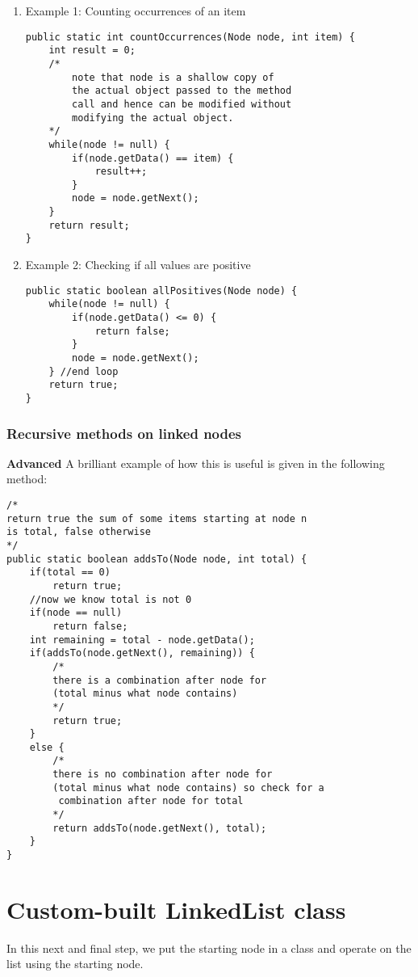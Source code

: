 \begin{enumerate}
\item Example 1: Counting occurrences of an item
\begin{lstlisting}
public static int countOccurrences(Node node, int item) {
	int result = 0;
	/*
		note that node is a shallow copy of 
		the actual object passed to the method 
		call and hence can be modified without
		modifying the actual object. 
	*/
	while(node != null) { 
		if(node.getData() == item) {
			result++;
		}
		node = node.getNext();
	}
	return result;
}	
\end{lstlisting}

\item Example 2: Checking if all values are positive
\begin{lstlisting}
public static boolean allPositives(Node node) {
	while(node != null) { 
		if(node.getData() <= 0) {
			return false;
		}
		node = node.getNext();
	} //end loop
	return true;
}	
\end{lstlisting}
\end{enumerate}

\newpage

\subsubsection{Recursive methods on linked nodes}

\textbf{Advanced} A brilliant example of how this is useful is given in the following method:

\begin{lstlisting}
/*
return true the sum of some items starting at node n
is total, false otherwise
*/
public static boolean addsTo(Node node, int total) {
	if(total == 0)
		return true;	
	//now we know total is not 0
	if(node == null) 
		return false;
	int remaining = total - node.getData();
	if(addsTo(node.getNext(), remaining)) {
		/*
		there is a combination after node for 
		(total minus what node contains)
		*/
		return true;
	}
	else {
		/*
		there is no combination after node for
		(total minus what node contains) so check for a
		 combination after node for total
		*/
		return addsTo(node.getNext(), total);
	}	
}	
\end{lstlisting}

\section{Custom-built LinkedList class}

In this next and final step, we put the starting node in a class and operate on the list using the starting node.

